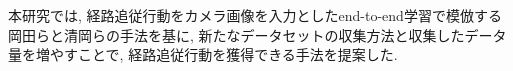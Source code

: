 
本研究では, 経路追従行動をカメラ画像を入力としたend-to-end学習で模倣する岡田ら\cite{okada-si}と清岡ら\cite{kiyooka-si}の手法を基に, 新たなデータセットの収集方法と収集したデータ量を増やすことで, 経路追従行動を獲得できる手法を提案した. 